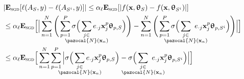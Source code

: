 \documentclass{article}
\newcommand{\Na}{\pazocal{N}}
\begin{document}
\begin{equation}~\label{eq:proof_part1}	
\begin{split}
& |\mathbf{E}_{\textsc{sgd}}[\ell(A_S,y) - \ell(A_{S^{i}} ,y)]|  \leq \alpha_{\ell} \mathbf{E}_{\textsc{sgd}}[| f(\mathbf{x},\bm{\uptheta}_S) -  f(\mathbf{x},\bm{\uptheta}_{S^{i}})|] \\
&  \leq  \alpha_{\ell} \mathbf{E}_{\textsc{sgd}}\Big[\Big|  \sum_{n=1}^{N} \Bigg( \sum_{p=1}^{P}  \sigma\Big(\sum_{\mathclap{\substack{j\in \\ \Na(\mathbf{x}_n)}}} e_{\cdot j} \mathbf{x}^{p}_{j} \bm{\uptheta}_{p,S}  \Big)  \Bigg) - \sum_{n=1}^{N} \Bigg( \sum_{p=1}^{P}\sigma\Big( \sum_{\mathclap{\substack{j \in \\ \Na(\mathbf{x}_n)}}} \  e_{\cdot j}   \mathbf{x}^{p}_{j} \bm{\uptheta}_{p, S^{i}} \Big)  \Bigg) \Big|\Big]  \\
&  \leq  \alpha_{\ell} \mathbf{E}_{\textsc{sgd}}\Big[  \sum_{n=1}^{N} \sum_{p=1}^{P}\Big|   \sigma\Big(\sum_{\mathclap{\substack{j\in \\ \Na(\mathbf{x}_n)}}} e_{\cdot j} \mathbf{x}^{p}_{j} \bm{\uptheta}_{p,S}  \Big) -  \sigma\Big( \sum_{\mathclap{\substack{j \in \\ \Na(\mathbf{x}_n)}}} \  e_{\cdot j}   \mathbf{x}^{p}_{j} \bm{\uptheta}_{p, S^{i}} \Big) \Big|\Big]   \\
\end{split}
\end{equation}
\end{document}
